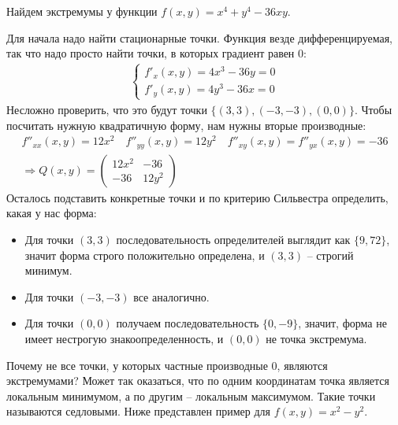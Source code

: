 \begin{example}
    Найдем экстремумы у функции $f(x, y) = x^4 + y^4 - 36xy$.

    Для начала надо найти стационарные точки.
    Функция везде дифференцируемая, так что надо просто найти точки, в которых градиент равен 0: \begin{gather*}
        \begin{cases}
            f'_x(x, y) = 4x^3 - 36y = 0 \\
            f'_y(x, y) = 4y^3 - 36x = 0
        \end{cases}
    \end{gather*}
    Несложно проверить, что это будут точки $\{ (3, 3), (-3, -3), (0, 0) \}$.
    Чтобы посчитать нужную квадратичную форму, нам нужны вторые производные: \begin{gather*} 
        f''_{xx}(x, y) = 12x^2 \quad f''_{yy}(x, y) = 12y^2 \quad f''_{xy}(x, y) = f''_{yx}(x, y) = -36 \\
        \Rightarrow Q(x, y) = \begin{pmatrix}
            12x^2 & -36 \\
            -36 & 12y^2
        \end{pmatrix}
    \end{gather*}
    Осталось подставить конкретные точки и по критерию Сильвестра определить, какая у нас форма: \begin{itemize}
        \item Для точки $(3, 3)$ последовательность определителей выглядит как $\{ 9, 72 \}$, значит форма строго положительно определена, и $(3, 3)$ -- строгий минимум.
        \item Для точки $(-3, -3)$ все аналогично.
        \item Для точки $(0, 0)$ получаем последовательность $\{ 0, -9 \}$, значит, форма не имеет нестрогую знакоопределенность, и $(0, 0)$ не точка экстремума.
    \end{itemize}
\end{example} 

\vspace*{5mm}

Почему не все точки, у которых частные производные 0, являются экстремумами?
Может так оказаться, что по одним координатам точка является локальным минимумом, а по другим -- локальным максимумом.
Такие точки называются седловыми. 
Ниже представлен пример для $f(x, y) = x^2 - y^2$.

\begin{center}
\end{center}

